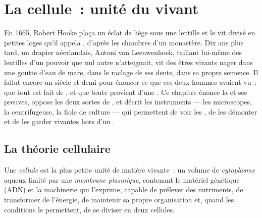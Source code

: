 \chapter{La cellule~: unité du vivant}\label{ch:b1:cell-unit-of-life}

En 1665, Robert Hooke plaça un éclat de liège sous une lentille et le
vit divisé en petites loges qu'il appela , d'après les chambres
d'un monastère. Dix ans plus tard, un drapier néerlandais, Antoni van
Leeuwenhoek, taillant lui-même des lentilles d'un pouvoir que nul autre
n'atteignait, vit des êtres vivants nager dans une goutte d'eau de mare,
dans le raclage de ses dents, dans sa propre semence. Il fallut encore
un siècle et demi pour énoncer ce que ces deux hommes avaient vu~: que
tout  est fait de , et que toute  provient d'une
. Ce chapitre énonce la  et ses preuves,
oppose les deux sortes de , et décrit les instruments --- les
microscopes, la centrifugeuse, la fiole de culture --- qui permettent de
voir les , de les démonter et de les garder vivantes hors d'un
.

\section{La théorie cellulaire}

\begin{definition}[Cellule]\label{def:b1:cell-unit-of-life:cell}
Une \emph{cellule} est la plus petite unité de matière
vivante~: un volume de \emph{cytoplasme} aqueux limité
par une \emph{membrane plasmique}, contenant
le matériel génétique (ADN) et la machinerie qui l'exprime, capable de
prélever des nutriments, de transformer de l'énergie, de maintenir sa
propre organisation et, quand les conditions le permettent, de se
diviser en deux cellules.
\end{definition}

